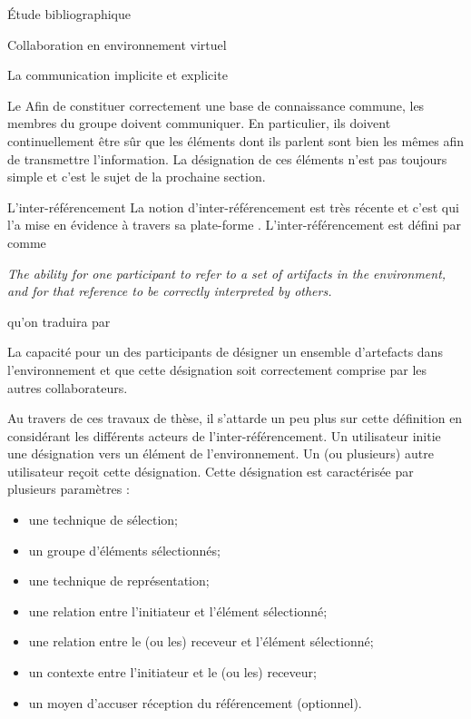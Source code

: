 \documentclass[myfrancais,ngerman,english,frenchb]{mythesis}
\begin{document}
\begin{mychapter}{Étude bibliographique}
\begin{mysection}{Collaboration en environnement virtuel}
\begin{mysubsection}{La communication implicite et explicite}
\begin{mysubsubsection}{Le }
					Afin de constituer correctement une base de connaissance commune, les membres du groupe doivent communiquer.
					En particulier, ils doivent continuellement être sûr que les éléments dont ils parlent sont bien les mêmes afin de transmettre l'information.
					La désignation de ces éléments n'est pas toujours simple et c'est le sujet de la prochaine section.
				\end{mysubsubsection}
				\begin{mysubsubsection}{L'inter-référencement}
					La notion d'inter-référencement est très récente et c'est  qui l'a mise en évidence à travers sa plate-forme \myAMMPVis {}.
					L'inter-référencement est défini par  comme
					\begin{myquote}[english]
						\it The ability for one participant to refer to a set of artifacts in the environment, and for that reference to be correctly interpreted by others.
					\end{myquote}
					qu'on traduira par
					\begin{myquote}[frenchb]
						La capacité pour un des participants de désigner un ensemble d'artefacts dans l'environnement et que cette désignation soit correctement comprise par les autres collaborateurs.
					\end{myquote}

					Au travers de ces travaux de thèse, il s'attarde un peu plus sur cette définition en considérant les différents acteurs de l'inter-référencement.
					Un utilisateur initie une désignation vers un élément de l'environnement.
					Un (ou plusieurs) autre utilisateur reçoit cette désignation.
					Cette désignation est caractérisée par plusieurs paramètres :
					\begin{itemize}
						\item une technique de sélection;
						\item un groupe d'éléments sélectionnés;
						\item une technique de représentation;
						\item une relation entre l'initiateur et l'élément sélectionné;
						\item une relation entre le (ou les) receveur et l'élément sélectionné;
						\item un contexte entre l'initiateur et le (ou les) receveur;
						\item un moyen d'accuser réception du référencement (optionnel).
					\end{itemize}


\end{mysubsubsection}
\end{mysubsection}
\end{mysection}
\end{mychapter}
\end{document}
